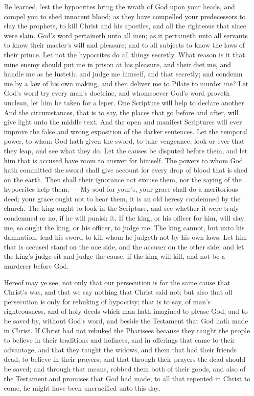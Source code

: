 Be learned, lest the hypocrites bring the wrath of God 
upon your heads, and compel you to shed innocent blood; 
as they have compelled your predecessors to slay the 
prophets, to kill Christ and his apostles, and all the 
righteous that since were slain. God's word pertaineth 
unto all men; as it pertaineth unto all servants to know 
their master's will and pleasure; and to all subjects to 
know the laws of their prince. Let not the hypocrites do 
all things secretly. What reason is it that mine enemy 
should put me in prison at his pleasure, and their diet 
me, and handle me as he lusteth; and judge me himself,
and that secretly; and condemn me by a law of his 
own making, and then deliver me to Pilate to murder me? 
Let God's word try every man's doctrine, and whomsoever 
God's word proveth unclean, let him be taken for a leper. 
One Scripture will help to declare another. And the circumstances,
that is to say, the places that go before and 
after, will give light unto the middle text. And the open 
and manifest Scriptures will ever improve the false and 
wrong exposition of the darker sentences. Let the temporal
power, to whom God hath given the sword, to take 
vengeance, look or ever that they leap, and see what they 
do. Let the causes be disputed before them, and let him 
that is accused have room to answer for himself. The 
powers to whom God hath committed the sword shall give 
account for every drop of blood that is shed on the 
earth. Then shall their ignorance not excuse them, nor 
the saying of the hypocrites help them, — My soul for 
your's, your grace shall do a meritorious deed; your 
grace ought not to hear them, it is an old heresy 
condemned by the church. The king ought to look in 
the Scripture, and see whether it were truly condemned 
or no, if he will punish it. If the king, or his officer for 
him, will slay me, so ought the king, or his officer, to 
judge me. The king cannot, but unto his damnation, 
lend his sword to kill whom he judgeth not by his own 
laws. Let him that is accused stand on the one side, and 
the accuser on the other side; and let the king's judge sit 
and judge the cause, if the king will kill, and not be a 
murderer before God. 

Hereof may ye see, not only that our persecution is for 
the same cause that Christ's was, and that we say nothing 
that Christ said not; but also that all persecution is only 
for rebuking of hypocrisy; that is to say, of man's righteousness,
and of holy deeds which man hath imagined to 
please God, and to be saved by, without God's word, and 
beside the Testament that God hath made in Christ. 
If Christ had not rebuked the Pharisees because they 
taught the people to believe in their traditions and holiness,
and in offerings that came to their advantage, and 
that they taught the widows, and them that had their 
friends dead, to believe in their prayers; and that through 
their prayers the dead should be saved; and through that 
means, robbed them both of their goods, and also of 
the Testament and promises that God had made, to all 
that repented in Christ to come, he might have been uncrucified
unto this day. 

